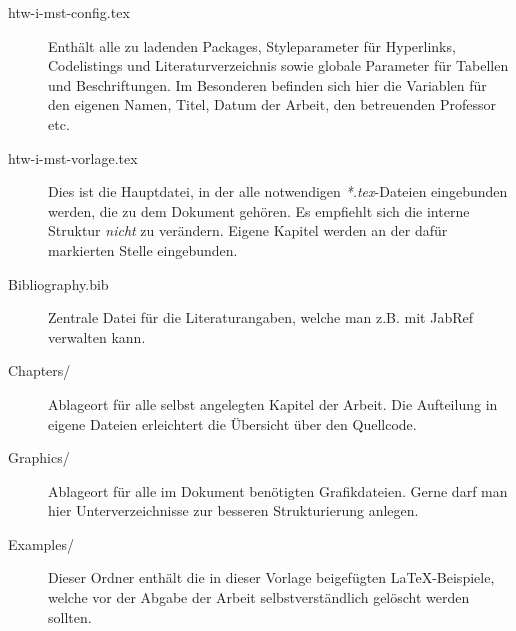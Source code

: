

\begin{description}
	\item [htw-i-mst-config.tex] Enthält alle zu ladenden Packages, Styleparameter für Hyperlinks, Codelistings und Literaturverzeichnis sowie globale Parameter 
	für Tabellen und Beschriftungen. Im Besonderen befinden sich hier die Variablen für den eigenen Namen, Titel, Datum der Arbeit, den betreuenden Professor etc.
	
	\item [htw-i-mst-vorlage.tex] Dies ist die Hauptdatei, in der alle notwendigen \textit{*.tex}-Dateien eingebunden werden, die zu dem Dokument gehören. Es empfiehlt sich
	die interne Struktur \textit{nicht} zu verändern. Eigene Kapitel werden an der dafür markierten Stelle eingebunden.
	
	\item [Bibliography.bib] Zentrale Datei für die Literaturangaben, welche man z.B. mit JabRef verwalten kann. 
	
	\item [Chapters/] Ablageort für alle selbst angelegten Kapitel der Arbeit. Die Aufteilung in eigene Dateien erleichtert die Übersicht über den Quellcode. 
	
	\item [Graphics/] Ablageort für alle im Dokument benötigten Grafikdateien. Gerne darf man hier Unterverzeichnisse zur besseren Strukturierung anlegen.
	
	\item [Examples/] Dieser Ordner enthält die in dieser Vorlage beigefügten LaTeX-Beispiele, welche vor der Abgabe der Arbeit selbstverständlich gelöscht werden sollten.
	

\end{description}
